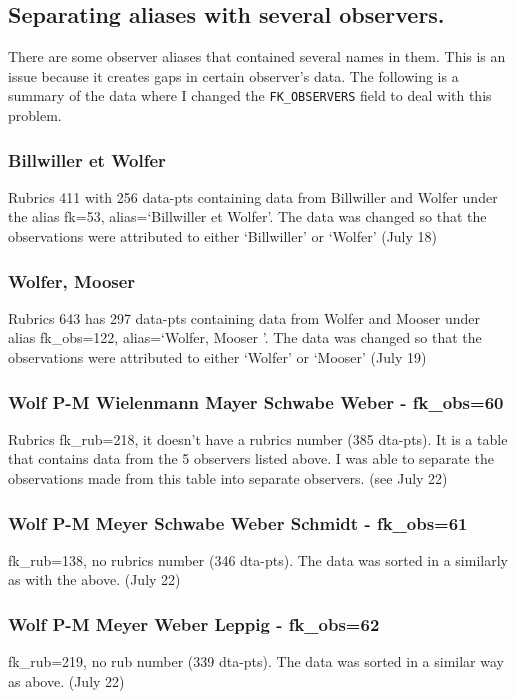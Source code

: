 \documentclass[12pt]{article}
\begin{document}
\subsection{Separating aliases with several observers.}
There are some observer aliases that contained several names in them. This is an issue because it creates gaps in certain observer's data. The following is a summary of the data where I changed the \texttt{FK\_OBSERVERS} field to deal with this problem. 

\subsubsection{Billwiller et Wolfer}
Rubrics 411 with 256 data-pts containing data from Billwiller and Wolfer under the alias fk=53, alias=`Billwiller et Wolfer'. The data was changed so that the observations were attributed to either `Billwiller' or `Wolfer' (July 18) 

\subsubsection{Wolfer, Mooser }
Rubrics 643 has 297 data-pts containing data from Wolfer and Mooser under alias fk\_obs=122, alias=`Wolfer, Mooser '. The data was changed so that the observations were attributed to either `Wolfer' or `Mooser' (July 19)

\subsubsection{Wolf P-M Wielenmann Mayer Schwabe Weber - fk\_obs=60}
Rubrics fk\_rub=218, it doesn't have a rubrics number (385 dta-pts). It is a table that contains data from the 5 observers listed above. I was able to separate the observations made from this table into separate observers. (see July 22)

\subsubsection{Wolf P-M Meyer Schwabe Weber Schmidt - fk\_obs=61}
fk\_rub=138, no rubrics number (346 dta-pts). The data was sorted in a similarly as with the above. (July 22)

\subsubsection{Wolf P-M Meyer Weber Leppig - fk\_obs=62}
fk\_rub=219, no rub number (339 dta-pts). The data was sorted in a similar way as above. (July 22)
\end{document}
